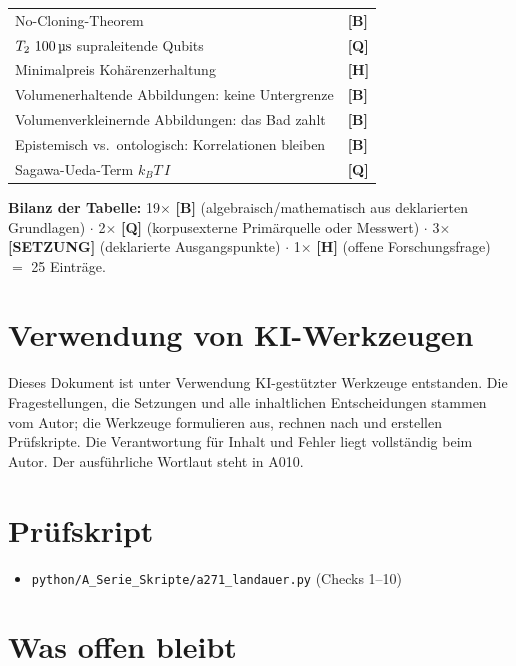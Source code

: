\begin{center}
\begin{longtable}{@{}p{}l@{}}
No-Cloning-Theorem & \textbf{[B]} \\
$T_2 \sim 100\,\text{\textmu s}$ supraleitende Qubits & \textbf{[Q]} \\
Minimalpreis Kohärenzerhaltung & \textbf{[H]} \\
Volumenerhaltende Abbildungen: keine Untergrenze & \textbf{[B]} \\
Volumenverkleinernde Abbildungen: das Bad zahlt & \textbf{[B]} \\
Epistemisch vs.\ ontologisch: Korrelationen bleiben & \textbf{[B]} \\
Sagawa-Ueda-Term $k_B T\,I$ & \textbf{[Q]} \\
\bottomrule
\end{longtable}
\end{center}

\textbf{Bilanz der Tabelle:} 19$\times$ \textbf{[B]} (algebraisch/mathematisch aus
deklarierten Grundlagen) $\cdot$ 2$\times$ \textbf{[Q]} (korpusexterne Primärquelle oder
Messwert) $\cdot$ 3$\times$ \textbf{[SETZUNG]} (deklarierte Ausgangspunkte) $\cdot$
1$\times$ \textbf{[H]} (offene Forschungsfrage) $=$ 25 Einträge.

\section{Verwendung von KI-Werkzeugen}

Dieses Dokument ist unter Verwendung KI-gestützter Werkzeuge entstanden. Die
Fragestellungen, die Setzungen und alle inhaltlichen Entscheidungen stammen vom
Autor; die Werkzeuge formulieren aus, rechnen nach und erstellen Prüfskripte.
Die Verantwortung für Inhalt und Fehler liegt vollständig beim Autor. Der
ausführliche Wortlaut steht in A010.

\section{Prüfskript}

\begin{itemize}
  \item \texttt{python/A\_Serie\_Skripte/a271\_landauer.py} (Checks 1--10)
\end{itemize}

\section{Was offen bleibt}

